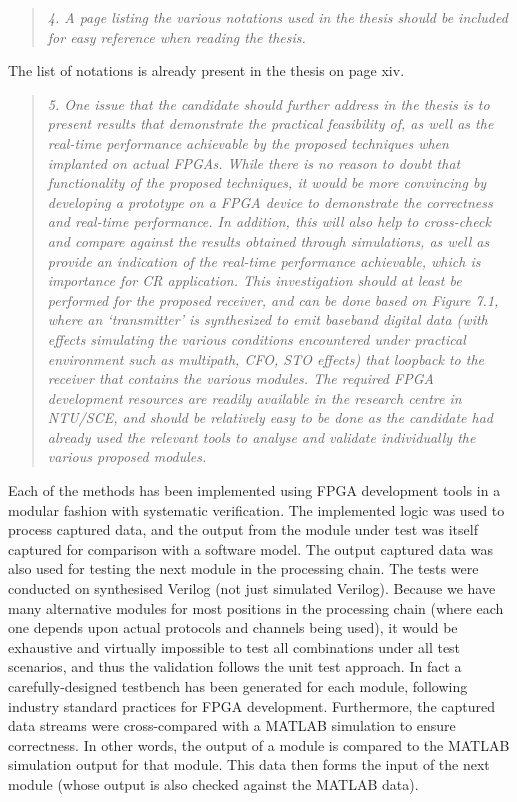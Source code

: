 \documentclass{article}
\begin{document}
\begin{quote}
\emph{4. A page listing the various notations used in the thesis should be included for easy reference when reading the thesis.}
\end{quote}
The list of notations is already present in the thesis on page xiv.

\begin{quote}
\emph{5. One issue that the candidate should further address in the thesis is to present results that demonstrate the practical feasibility of, as well as the real-time performance achievable by the proposed techniques when implanted on actual FPGAs. While there is no reason to doubt that functionality of the proposed techniques, it would be more convincing by developing a prototype on a FPGA device to demonstrate the correctness and real-time performance. In addition, this will also help to cross-check and compare against the results obtained through simulations, as well as provide an indication of the real-time performance achievable, which is importance for CR application. This investigation should at least be performed for the proposed receiver, and can be done based on Figure 7.1, where an `transmitter' is synthesized to emit baseband digital data (with effects simulating the various conditions encountered under practical environment such as multipath, CFO, STO effects) that loopback to the receiver that contains the various modules. The required FPGA development resources are readily available in the research centre in NTU/SCE, and should be relatively easy to be done as the candidate had already used the relevant tools to analyse and validate individually the various proposed modules.}
\end{quote}

Each of the methods has been implemented using FPGA development tools in a modular fashion with systematic verification. The implemented logic was used to process captured data, and the output from the module under test was itself captured for comparison with a software model. The output captured data was also used for testing the next module in the processing chain. The tests were conducted on synthesised Verilog (not just simulated Verilog). Because we have many alternative modules for most positions in the processing chain (where each one depends upon actual protocols and channels being used), it would be exhaustive and virtually impossible to test all combinations under all test scenarios, and thus the validation follows the unit test approach.
In fact a carefully-designed testbench has been generated for each module, following industry standard practices for FPGA development.
Furthermore, the captured data streams were cross-compared with a MATLAB simulation to ensure correctness. In other words, the output of a module is compared to the MATLAB simulation output for that module. This data then forms the input of the next module (whose output is also checked against the MATLAB data).
\end{document}

